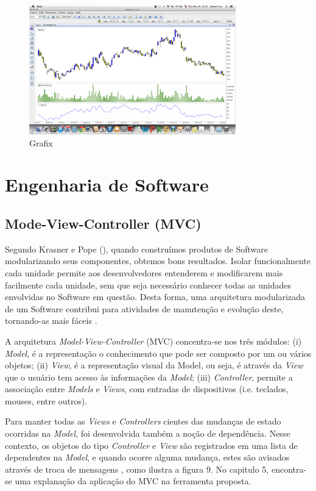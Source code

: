 \begin{description}
\begin{figure}[h!]
\centering
\label{f05}
\includegraphics[width=0.8\textwidth]{figuras/f05}
\caption{Grafix}
\end{figure}
\FloatBarrier

\end{description}

\section{Engenharia de Software}
\subsection{Mode-View-Controller (MVC)}

Segundo Krasner e Pope (\citeyear{krasner1988}), quando construímos produtos de Software modularizando seus componentes, obtemos bons resultados. Isolar funcionalmente cada unidade permite aos desenvolvedores entenderem e modificarem mais facilmente cada unidade, sem que seja necessário conhecer todas as unidades envolvidas no Software em questão. Desta forma, uma arquitetura modularizada de um Software contribui para atividades de manutenção e evolução deste, tornando-as mais fáceis \cite[p. 1]{krasner1988}.


A arquitetura \textit{Model-View-Controller} (MVC) concentra-se nos três módulos: (i) \textit{Model}, é a representação o conhecimento que pode ser composto por um ou vários objetos; (ii) \textit{View}, é a representação visual da Model, ou seja, é através da \textit{View} que o usuário tem acesso às informações da \textit{Model}; (iii) \textit{Controller}, permite a associação entre \textit{Models} e \textit{Views}, com entradas de dispositivos (i.e. teclados, mouses, entre outros)\cite[p. 2]{krasner1988}.


Para manter todas as \textit{Views} e \textit{Controllers} cientes das mudanças de estado ocorridas na \textit{Model}, foi desenvolvida também a noção de dependência. Nesse contexto, os objetos do tipo \textit{Controller} e \textit{View} são registrados em uma lista de dependentes na \textit{Model}, e quando ocorre alguma mudança, estes são avisados através de troca de mensagens \cite[p. 2]{krasner1988}, como ilustra a figura 9. No capitulo 5, encontra-se uma explanação da aplicação do MVC na ferramenta proposta.

